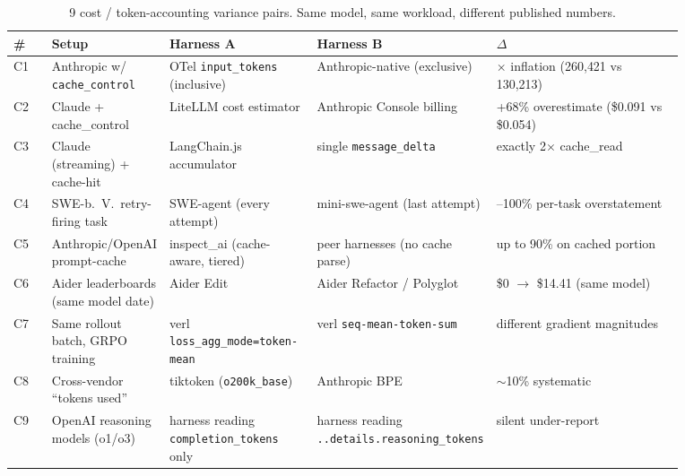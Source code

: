 \documentclass{article}
\begin{document}
\begin{table}[h]
\centering
\footnotesize
\setlength{\tabcolsep}{3pt}
\caption{9 cost / token-accounting variance pairs. Same model,
same workload, different published numbers.}
\label{tab:vc:cost}
\begin{tabular}{@{}l>{\raggedright\arraybackslash}p{0.15\linewidth}>{\raggedright\arraybackslash}p{0.22\linewidth}>{\raggedright\arraybackslash}p{0.22\linewidth}>{\raggedright\arraybackslash}p{0.28\linewidth}@{}}
\toprule
\textbf{\#} & \textbf{Setup} & \textbf{Harness A} &
\textbf{Harness B} & \textbf{$\Delta$} \\
\midrule
C1 & Anthropic w/ \texttt{cache\_control}  & OTel \texttt{input\_tokens} (inclusive) & Anthropic-native (exclusive)       & 2.0$\times$ inflation (260{,}421 vs 130{,}213) \\
C2 & Claude + cache\_control               & LiteLLM cost estimator                  & Anthropic Console billing          & +68\% overestimate (\$0.091 vs \$0.054) \\
C3 & Claude (streaming) + cache-hit        & LangChain.js accumulator                & single \texttt{message\_delta}     & exactly 2$\times$ cache\_read          \\
C4 & SWE-b.\ V.\ retry-firing task         & SWE-agent (every attempt)               & mini-swe-agent (last attempt)      & 30--100\% per-task overstatement       \\
C5 & Anthropic/OpenAI prompt-cache         & inspect\_ai (cache-aware, tiered)       & 7 peer harnesses (no cache parse)  & up to 90\% on cached portion           \\
C6 & Aider leaderboards (same model date)  & Aider Edit                              & Aider Refactor / Polyglot          & \$0 $\to$ \$14.41 (same model)         \\
C7 & Same rollout batch, GRPO training     & verl \texttt{loss\_agg\_mode=}\allowbreak\texttt{token-mean} & verl \texttt{seq-mean-}\allowbreak\texttt{token-sum}  & different gradient magnitudes          \\
C8 & Cross-vendor ``tokens used''          & tiktoken (\texttt{o200k\_base})         & Anthropic BPE                      & $\sim$10\% systematic                  \\
C9 & OpenAI reasoning models (o1/o3)       & harness reading \texttt{completion\_}\allowbreak\texttt{tokens} only & harness reading \texttt{..details.}\allowbreak\texttt{reasoning\_tokens} & silent under-report \\
\bottomrule
\end{tabular}
\end{table}
\end{document}

